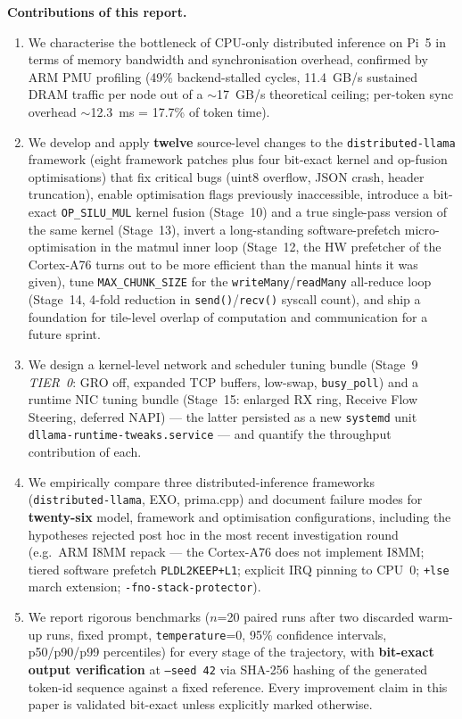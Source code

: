 \documentclass[10pt,a4paper]{article}
\begin{document}
\textbf{Contributions of this report.}
\begin{enumerate}
  \item We characterise the bottleneck of CPU-only distributed inference on Pi~5 in terms of memory bandwidth and synchronisation overhead, confirmed by ARM PMU profiling (49\% backend-stalled cycles, 11.4~GB/s sustained DRAM traffic per node out of a $\sim$17~GB/s theoretical ceiling; per-token sync overhead $\sim$12.3~ms = 17.7\% of token time).
  \item We develop and apply \textbf{twelve} source-level changes to the \texttt{distributed-llama} framework (eight framework patches plus four bit-exact kernel and op-fusion optimisations) that fix critical bugs (uint8 overflow, JSON crash, header truncation), enable optimisation flags previously inaccessible, introduce a bit-exact \texttt{OP\_SILU\_MUL} kernel fusion (Stage~10) and a true single-pass version of the same kernel (Stage~13), invert a long-standing software-prefetch micro-optimisation in the matmul inner loop (Stage~12, the HW prefetcher of the Cortex-A76 turns out to be more efficient than the manual hints it was given), tune \texttt{MAX\_CHUNK\_SIZE} for the \texttt{writeMany}/\texttt{readMany} all-reduce loop (Stage~14, 4-fold reduction in \texttt{send()}/\texttt{recv()} syscall count), and ship a foundation for tile-level overlap of computation and communication for a future sprint.
  \item We design a kernel-level network and scheduler tuning bundle (Stage~9 \emph{TIER~0}: GRO off, expanded TCP buffers, low-swap, \texttt{busy\_poll}) and a runtime NIC tuning bundle (Stage~15: enlarged RX ring, Receive Flow Steering, deferred NAPI) --- the latter persisted as a new \texttt{systemd} unit \texttt{dllama-runtime-tweaks.service} --- and quantify the throughput contribution of each.
  \item We empirically compare three distributed-inference frameworks (\texttt{distributed-llama}, EXO, prima.cpp) and document failure modes for \textbf{twenty-six} model, framework and optimisation configurations, including the hypotheses rejected post hoc in the most recent investigation round (e.g.\ ARM I8MM repack --- the Cortex-A76 does not implement I8MM; tiered software prefetch \texttt{PLDL2KEEP+L1}; explicit IRQ pinning to CPU~0; \texttt{+lse} march extension; \texttt{-fno-stack-protector}).
  \item We report rigorous benchmarks ($n$=20 paired runs after two discarded warm-up runs, fixed prompt, \texttt{temperature}=0, 95\% confidence intervals, p50/p90/p99 percentiles) for every stage of the trajectory, with \textbf{bit-exact output verification} at \texttt{--seed~42} via SHA-256 hashing of the generated token-id sequence against a fixed reference. Every improvement claim in this paper is validated bit-exact unless explicitly marked otherwise.
\end{enumerate}
\end{document}
